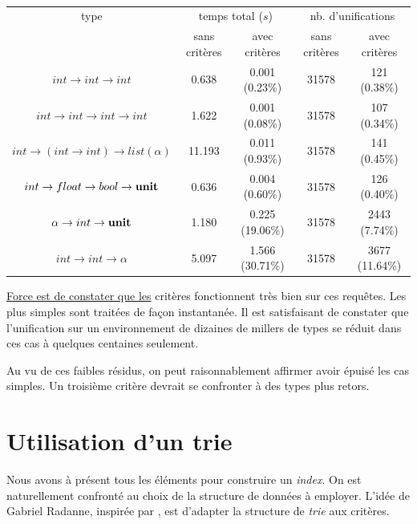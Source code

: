 \documentclass[a4paper]{report}
\theoremstyle{definition}
\newcommand\reformule[1]{\underline{#1}}
\begin{document}
{\begin{table}[h]
  \centering
  \begin{tabular}{|*{5}{c|}}
    \hline
      type &
      \multicolumn{2}{c|}{temps total ($s$)} &
      \multicolumn{2}{c|}{nb. d'unifications}
    \\
    \cline{2-5}
      &
      sans critères & avec critères &
      sans critères & avec critères
    \\
    \hline
      $int \rightarrow int \rightarrow int$ &
      0.638 & 0.001 (0.23\%) &
      31578 & 121 (0.38\%)
    \\
      $int \rightarrow int \rightarrow int \rightarrow int$ &
      1.622 & 0.001 (0.08\%) &
      31578 & 107 (0.34\%)
    \\
      $int \rightarrow (int \rightarrow int) \rightarrow list (\alpha)$ &
      11.193 & 0.011 (0.93\%) &
      31578 & 141 (0.45\%)
    \\
      $int \rightarrow float \rightarrow bool \rightarrow \bold{unit}$ &
      0.636 & 0.004 (0.60\%) &
      31578 & 126 (0.40\%)
    \\
      $\alpha \rightarrow int \rightarrow \bold{unit}$ &
      1.180 & 0.225 (19.06\%) &
      31578 & 2443 (7.74\%)
    \\
      $int \rightarrow int \rightarrow \alpha$ &
      5.097 & 1.566 (30.71\%) &
      31578 & 3677 (11.64\%)
    \\
    \hline
  \end{tabular}
  \caption{\label{tab_apport2}}
\end{table}

\reformule{Force est de constater que les} critères fonctionnent très bien sur ces requêtes. Les plus simples sont traitées de façon instantanée. Il est satisfaisant de constater que l'unification sur un environnement de dizaines de millers de types se réduit dans ces cas à quelques centaines seulement.

Au vu de ces faibles résidus, on peut raisonnablement affirmer avoir épuisé les cas simples. Un troisième critère devrait se confronter à des types plus retors.


\section{Utilisation d'un trie}

Nous avons à présent tous les éléments pour construire un \emph{index}. On est naturellement confronté au choix de la structure de données à employer. L'idée de Gabriel Radanne, inspirée par \cite{Schulz}, est d'adapter la structure de \emph{trie} aux critères.

}
\end{document}
